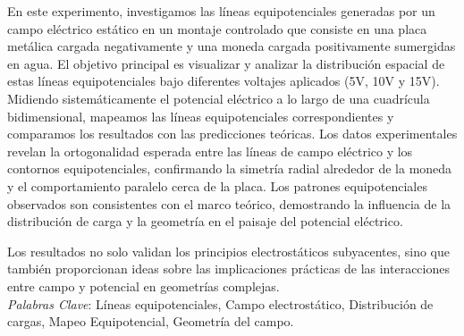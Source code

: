 \documentclass[article,12pt]{elsarticle}
\begin{document}
En este experimento, investigamos las líneas equipotenciales generadas por un campo eléctrico estático en un montaje controlado que consiste en una placa metálica cargada negativamente y una moneda cargada positivamente sumergidas en agua. El objetivo principal es visualizar y analizar la distribución espacial de estas líneas equipotenciales bajo diferentes voltajes aplicados (5V, 10V y 15V). Midiendo sistemáticamente el potencial eléctrico a lo largo de una cuadrícula bidimensional, mapeamos las líneas equipotenciales correspondientes y comparamos los resultados con las predicciones teóricas. Los datos experimentales revelan la ortogonalidad esperada entre las líneas de campo eléctrico y los contornos equipotenciales, confirmando la simetría radial alrededor de la moneda y el comportamiento paralelo cerca de la placa. Los patrones equipotenciales observados son consistentes con el marco teórico, demostrando la influencia de la distribución de carga y la geometría en el paisaje del potencial eléctrico.

\newpage
Los resultados no solo validan los principios electrostáticos subyacentes, sino que también proporcionan ideas sobre las implicaciones prácticas de las interacciones entre campo y potencial en geometrías complejas.\\

\textit{Palabras Clave}: Líneas equipotenciales, Campo electrostático, Distribución de cargas, Mapeo Equipotencial, Geometría del campo.\\ \hline
\end{document}
